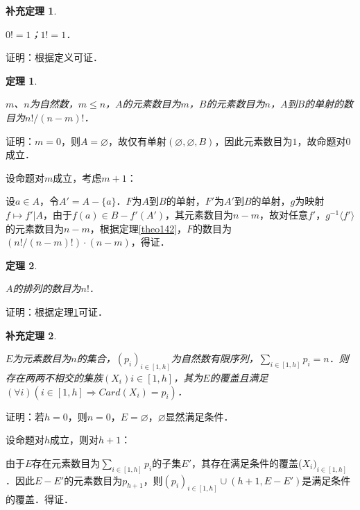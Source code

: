 \documentclass[12pt, a4paper, oneside]{book}
\newtheorem{theo}{定理}
\newtheorem{cor}{补充定理}
\begin{document}
			\begin{cor}\label{cor321}
				\hfill\par
				$0!=1$；$1!=1$．
			\end{cor}
			证明：根据定义可证．
			
			\begin{theo}\label{theo143}
				\hfill\par
				$m$、$n$为自然数，$m\leq n$，$A$的元素数目为$m$，$B$的元素数目为$n$，$A$到$B$的单射的数目为$n!/(n-m)!$．
			\end{theo}
			证明：$m=0$，则$A=\varnothing$，故仅有单射$(\varnothing, \varnothing, B)$，因此元素数目为$1$，故命题对$0$成立．
			\par
			设命题对$m$成立，考虑$m+1$：
			\par
			设$a\in A$，令$A'=A-\{a\}$．$F$为$A$到$B$的单射，$F'$为$A'$到$B$的单射，$g$为映射$f\mapsto f'|A$，由于$f(a)\in B-f'(A')$，其元素数目为$n-m$，故对任意$f'$，$g^{-1}\langle f'\rangle$的元素数目为$n-m$，根据定理\ref{theo142}，$F$的数目为$(n!/(n-m)!)\cdot (n-m)$，得证．
			
			\begin{theo}\label{theo144}
				\hfill\par
				$A$的排列的数目为$n!$．
			\end{theo}
			证明：根据定理\ref{theo143}可证．
			
			\begin{cor}\label{cor322}
				\hfill\par
				$E$为元素数目为$n$的集合，$(p_i)_{i\in [1, h]}$为自然数有限序列，$\sum\limits_{i\in [1, h]}p_i=n$．则存在两两不相交的集族$(X_i)i\in[1, h]$，其为$E$的覆盖且满足$(\forall i)(i\in [1, h]\Rightarrow Card(X_i)=p_i)$．
			\end{cor}
			证明：若$h=0$，则$n=0$，$E=\varnothing$，$\varnothing$显然满足条件．
			\par
			设命题对$h$成立，则对$h+1$：
			\par
			由于$E$存在元素数目为$\sum\limits_{i\in [1, h]}p_i$的子集$E'$，其存在满足条件的覆盖($X_i)_{i\in [1, h]}$．因此$E-E'$的元素数目为$p_{h+1}$，则$(p_i)_{i\in [1, h]}\cup(h+1, E-E')$是满足条件的覆盖．得证．
			
\end{document}
